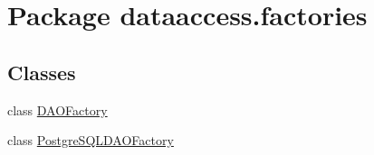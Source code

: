 \hypertarget{namespacedataaccess_1_1factories}{\section{\-Package dataaccess.\-factories}
\label{namespacedataaccess_1_1factories}
}
\subsection*{\-Classes}
\begin{DoxyCompactItemize}
\item 
class \hyperlink{classdataaccess_1_1factories_1_1_d_a_o_factory}{\-D\-A\-O\-Factory}
\item 
class \hyperlink{classdataaccess_1_1factories_1_1_postgre_s_q_l_d_a_o_factory}{\-Postgre\-S\-Q\-L\-D\-A\-O\-Factory}
\end{DoxyCompactItemize}
